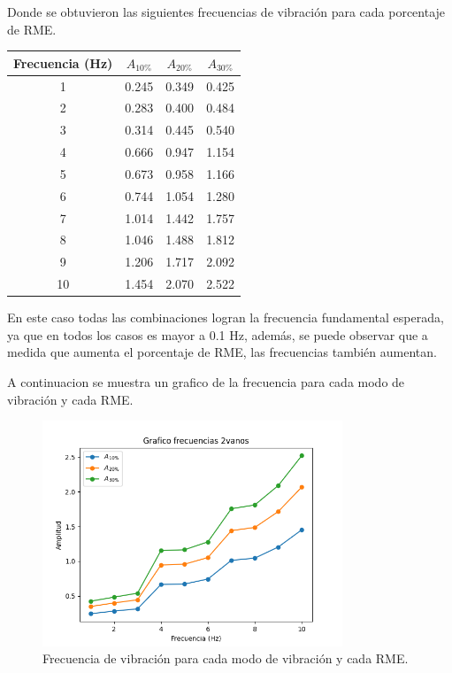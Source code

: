 Donde se obtuvieron las siguientes frecuencias de vibración para cada porcentaje de RME.

\begin{table}[H]
    \centering
    \begin{tabular}{cccc}
    \toprule
     Frecuencia (Hz) & $A_{10\%}$ & $A_{20\%}$ & $A_{30\%}$ \\
    \midrule
     1 &  0.245 &  0.349 &  0.425 \\
     2 &  0.283 &  0.400 &  0.484 \\
     3 &  0.314 &  0.445 &  0.540 \\
     4 &  0.666 &  0.947 &  1.154 \\
     5 &  0.673 &  0.958 &  1.166 \\
     6 &  0.744 &  1.054 &  1.280 \\
     7 &  1.014 &  1.442 &  1.757 \\
     8 &  1.046 &  1.488 &  1.812 \\
     9 &  1.206 &  1.717 &  2.092 \\
     10 &  1.454 &  2.070 &  2.522 \\
    \bottomrule
    \end{tabular}
\end{table}

En este caso todas las combinaciones logran la frecuencia fundamental esperada, ya que en todos los casos es mayor a 0.1 Hz, además, se puede observar que a medida que aumenta el porcentaje de RME, las frecuencias también aumentan.

A continuacion se muestra un grafico de la frecuencia para cada modo de vibración y cada RME. 

\begin{figure}[H]
    \centering
    \includegraphics[width=0.8\textwidth]{../grafico_frecuencias_2vanos.png}
    \caption{Frecuencia de vibración para cada modo de vibración y cada RME.}
\end{figure}

